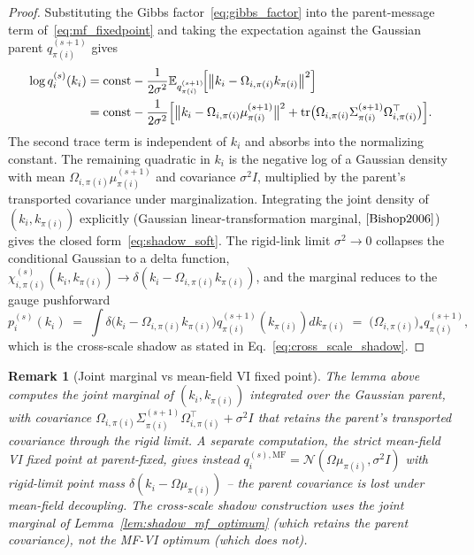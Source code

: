 \documentclass[11pt]{article}
\newtheorem{remark}{Remark}
\begin{document}
\begin{proof}
Substituting the Gibbs factor~\eqref{eq:gibbs_factor} into the parent-message term of~\eqref{eq:mf_fixedpoint} and taking the expectation against the Gaussian parent $q_{\pi(i)}^{(s+1)}$ gives
\begin{align}
\log q_i^{(s)}(k_i) &= \text{const} - \frac{1}{2\sigma^2} \mathbb{E}_{q_{\pi(i)}^{(s+1)}}\!\Big[\big\|k_i - \Omega_{i,\pi(i)} k_{\pi(i)}\big\|^2\Big] \notag\\
&= \text{const} - \frac{1}{2\sigma^2}\Big[\big\|k_i - \Omega_{i,\pi(i)}\mu_{\pi(i)}^{(s+1)}\big\|^2 + \operatorname{tr}\!\big(\Omega_{i,\pi(i)}\Sigma_{\pi(i)}^{(s+1)}\Omega_{i,\pi(i)}^\top\big)\Big].
\end{align}
The second trace term is independent of $k_i$ and absorbs into the normalizing constant. The remaining quadratic in $k_i$ is the negative log of a Gaussian density with mean $\Omega_{i,\pi(i)}\mu_{\pi(i)}^{(s+1)}$ and covariance $\sigma^2 I$, multiplied by the parent's transported covariance under marginalization. Integrating the joint density of $(k_i, k_{\pi(i)})$ explicitly (Gaussian linear-transformation marginal, $\cite[\S2.3]{Bishop2006}$) gives the closed form~\eqref{eq:shadow_soft}. The rigid-link limit $\sigma^2 \to 0$ collapses the conditional Gaussian to a delta function, $\chi_{i,\pi(i)}^{(s)}(k_i, k_{\pi(i)}) \to \delta(k_i - \Omega_{i,\pi(i)} k_{\pi(i)})$, and the marginal reduces to the gauge pushforward
\begin{equation}
p_i^{(s)}(k_i) \;=\; \int \delta\!\big(k_i - \Omega_{i,\pi(i)} k_{\pi(i)}\big) q_{\pi(i)}^{(s+1)}(k_{\pi(i)})  dk_{\pi(i)} \;=\; \big(\Omega_{i,\pi(i)}\big)_*\! q_{\pi(i)}^{(s+1)},
\end{equation}
which is the cross-scale shadow as stated in Eq.~\eqref{eq:cross_scale_shadow}.
\end{proof}

\begin{remark}[Joint marginal vs mean-field VI fixed point]
The lemma above computes the joint marginal of $(k_i, k_{\pi(i)})$ integrated over the Gaussian parent, with covariance $\Omega_{i,\pi(i)} \Sigma_{\pi(i)}^{(s+1)} \Omega_{i,\pi(i)}^\top + \sigma^2 I$ that retains the parent's transported covariance through the rigid limit. A separate computation, the strict mean-field VI fixed point at parent-fixed, gives instead $q_i^{(s),\mathrm{MF}} = \mathcal{N}(\Omega \mu_{\pi(i)}, \sigma^2 I)$ with rigid-limit point mass $\delta(k_i - \Omega \mu_{\pi(i)})$ -- the parent covariance is lost under mean-field decoupling. The cross-scale shadow construction uses the joint marginal of Lemma~\ref{lem:shadow_mf_optimum} (which retains the parent covariance), not the MF-VI optimum (which does not).
\end{remark}
\end{document}

